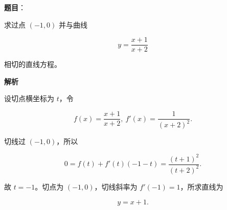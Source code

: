\begin{answer}

\textbf{题目}：

求过点 $(-1,0)$ 并与曲线

\nopagebreak[4]
\[
y=\frac{x+1}{x+2}
\]

相切的直线方程。

\textbf{解析}

设切点横坐标为 $t$，令

\nopagebreak[4]
\[
f(x)=\frac{x+1}{x+2},\ f'(x)=\frac1{(x+2)^2}.
\]

切线过 $(-1,0)$，所以

\nopagebreak[4]
\[
0=f(t)+f'(t)(-1-t)
=\frac{(t+1)^2}{(t+2)^2}.
\]

故 $t=-1$。切点为 $(-1,0)$，切线斜率为 $f'(-1)=1$，所求直线为

\nopagebreak[4]
\[
y=x+1.
\]


\end{answer}